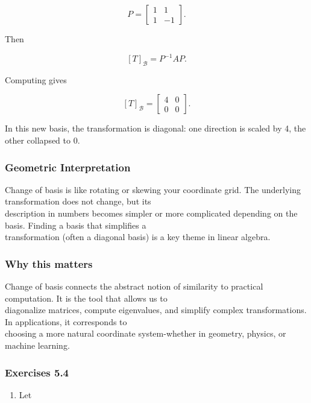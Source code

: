 \documentclass[
  12pt,
  a4paper,
]{article}
\begin{document}
\[P = \begin{bmatrix}
1 & 1 \\
1 & -1
\end{bmatrix}.\]

Then

\[[T]_{\mathcal{B}} = P^{-1} A P.\]

Computing gives

\[[T]_{\mathcal{B}} =
\begin{bmatrix}
4 & 0 \\
0 & 0
\end{bmatrix}.\]

In this new basis, the transformation is diagonal: one direction is
scaled by 4, the other collapsed to 0.

\subsubsection{Geometric
Interpretation}\label{geometric-interpretation-11}

Change of basis is like rotating or skewing your coordinate grid. The
underlying transformation does not change, but its\\
description in numbers becomes simpler or more complicated depending on
the basis. Finding a basis that simplifies a\\
transformation (often a diagonal basis) is a key theme in linear
algebra.

\subsubsection{Why this matters}\label{why-this-matters-19}

Change of basis connects the abstract notion of similarity to practical
computation. It is the tool that allows us to\\
diagonalize matrices, compute eigenvalues, and simplify complex
transformations. In applications, it corresponds to\\
choosing a more natural coordinate system-whether in geometry, physics,
or machine learning.

\subsubsection{Exercises 5.4}\label{exercises-54}

\begin{enumerate}
\def\labelenumi{\arabic{enumi}.}
\item
  Let
\end{enumerate}
\end{document}
